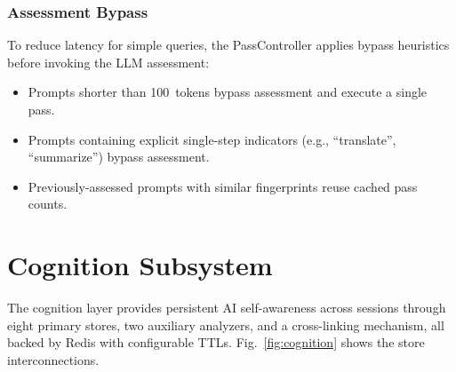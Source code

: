 \documentclass[journal,10pt]{IEEEtran}
\begin{document}
\subsubsection{Assessment Bypass}

To reduce latency for simple queries, the PassController applies bypass heuristics before invoking the LLM assessment:

\begin{itemize}[nosep]
\item Prompts shorter than 100~tokens bypass assessment and execute a single pass.
\item Prompts containing explicit single-step indicators (e.g., ``translate'', ``summarize'') bypass assessment.
\item Previously-assessed prompts with similar fingerprints reuse cached pass counts.
\end{itemize}

\section{Cognition Subsystem}
\label{sec:cognition}

The cognition layer provides persistent AI self-awareness across sessions through eight primary stores, two auxiliary analyzers, and a cross-linking mechanism, all backed by Redis with configurable TTLs. Fig.~\ref{fig:cognition} shows the store interconnections.
\end{document}
